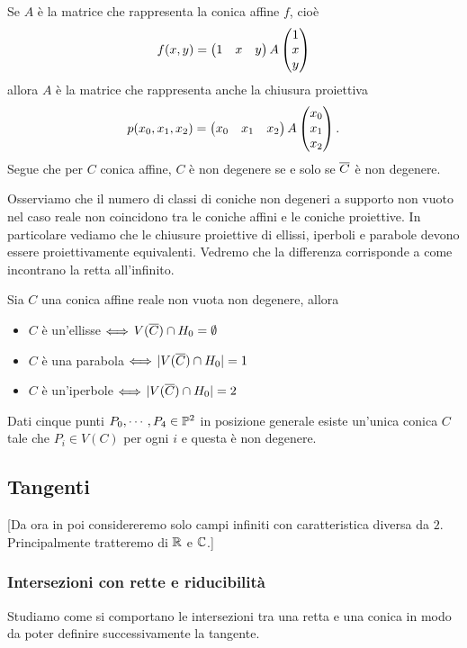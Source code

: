 \begin{multicols*}{2}
    \begin{remark}
    Se $A$ \`e la matrice che rappresenta la conica affine $f$, cio\`e
    \[f(x,y)=\begin{pmatrix}1 & x & y\end{pmatrix}A\begin{pmatrix}1\\ x\\ y\end{pmatrix}\]
    allora $A$ \`e la matrice che rappresenta anche la chiusura proiettiva
    \[p(x_0,x_1,x_2)=\begin{pmatrix}x_0 & x_1 & x_2\end{pmatrix}A\begin{pmatrix}x_0\\ x_1\\ x_2\end{pmatrix}.\]
    Segue che per $C$ conica affine, $C$ \`e non degenere se e solo se $\overline{C}$ \`e non degenere.
    \end{remark}
    \begin{remark}
    Osserviamo che il numero di classi di coniche non degeneri a supporto non vuoto nel caso reale non coincidono tra le coniche affini e le coniche proiettive.
    In particolare vediamo che le chiusure proiettive di ellissi, iperboli e parabole devono essere proiettivamente equivalenti. Vedremo che la differenza corrisponde a come incontrano la retta all'infinito.
    \end{remark}

    \begin{theorem}
    Sia $C$ una conica affine reale non vuota non degenere, allora
    \begin{itemize}[noitemsep]
    \item $C$ \`e un'ellisse $\Longleftrightarrow$ $V(\overline{C})\cap H_0=\emptyset$
    \item $C$ \`e una parabola $\Longleftrightarrow$ $|V(\overline{C})\cap H_0|=1$
    \item $C$ \`e un'iperbole $\Longleftrightarrow$ $|V(\overline{C})\cap H_0|=2$
    \end{itemize}
    \end{theorem}

    \begin{proposition}
    Dati cinque punti $P_0,\cdots, P_4\in \mathbb{P}^2$ in posizione generale esiste un'unica conica $C$ tale che $P_i\in V(C)$ per ogni $i$ e questa \`e non degenere.
    \end{proposition}



    \subsection{Tangenti}
    [Da ora in poi considereremo solo campi infiniti con caratteristica diversa da $2$. Principalmente tratteremo di $\mathbb{R}$ e $\mathbb{C}$.]

    \subsubsection{Intersezioni con rette e riducibilit\`a}
    Studiamo come si comportano le intersezioni tra una retta e una conica in modo da poter definire successivamente la tangente.


\end{multicols*}
